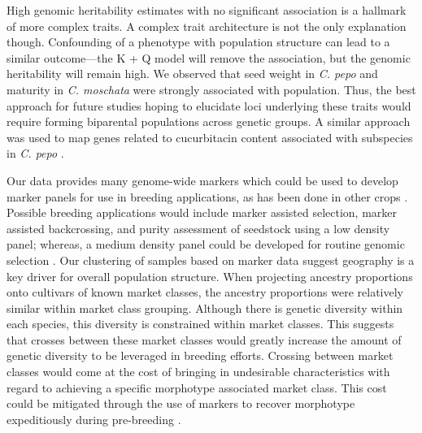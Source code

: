 \documentclass[utf8]{FrontiersinHarvard} %
\begin{document}
High genomic heritability estimates with no significant association is a hallmark of more complex traits. A complex trait architecture is not the only explanation though. Confounding of a phenotype with population structure can lead to a similar outcome---the K + Q model will remove the association, but the genomic heritability will remain high. We observed that seed weight in \textit{C. pepo} and maturity in \textit{C. moschata} were strongly associated with population. Thus, the best approach for future studies hoping to elucidate loci underlying these traits would require forming biparental populations across genetic groups. A similar approach was used to map genes related to cucurbitacin content associated with subspecies in \textit{C. pepo} \citep{Brzozowski2020}.

Our data provides many genome-wide markers which could be used to develop marker panels for use in breeding applications, as has been done in other crops \citep{Arbelaez2019}. Possible breeding applications would include marker assisted selection, marker assisted backcrossing, and purity assessment of seedstock using a low density panel; whereas, a medium density panel could be developed for routine genomic selection \citep{Cerioli2022}. Our clustering of samples based on marker data suggest geography is a key driver for overall population structure. When projecting ancestry proportions onto cultivars of known market classes, the ancestry proportions were relatively similar within market class grouping. Although there is genetic diversity within each species, this diversity is constrained within market classes. This suggests that crosses between these market classes would greatly increase the amount of genetic diversity to be leveraged in breeding efforts. Crossing between market classes would come at the cost of bringing in undesirable characteristics with regard to achieving a specific morphotype associated market class. This cost could be mitigated through the use of markers to recover morphotype expeditiously during pre-breeding \citep{Cobb2019}. 
\end{document}

